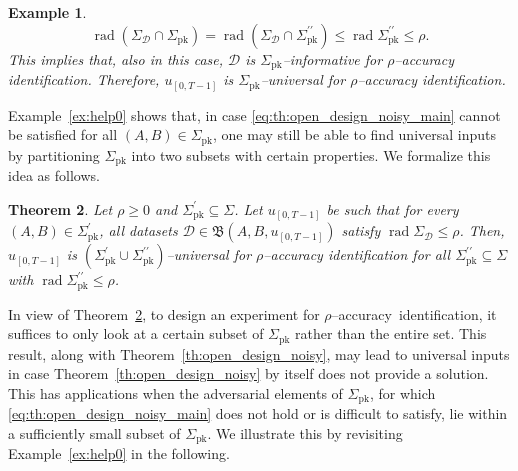 \documentclass[journal,twoside,web]{ieeecolor}
\DeclareMathOperator{\rad}{rad}
\newtheorem{theorem}{Theorem}
\newtheorem{example}[theorem]{Example}
\begin{document}
\begin{example}
\begin{equation}
\rad(\Sigma_\mathcal{D}\cap\Sigma_\text{pk})=\rad(\Sigma_\mathcal{D}\cap\Sigma_\text{pk}^{\prime\prime})\leq\rad\Sigma_\text{pk}^{\prime\prime}\leq \rho.
\end{equation}
This implies that, also in this case, $\mathcal{D}$ is $\Sigma_\text{pk}$--informative for \mbox{$\rho$--accuracy} identification. Therefore, $u_{[0,T-1]}$ is \mbox{$\Sigma_\text{pk}$--universal} for \mbox{$\rho$--accuracy} identification. 
\end{example}

Example~\ref{ex:help0} shows that, in case \eqref{eq:th:open_design_noisy_main} cannot be satisfied for all $(A,B)\in\Sigma_\text{pk}$, one may still be able to find universal inputs by partitioning $\Sigma_\text{pk}$ into two subsets with certain properties. We formalize this idea as follows. 

\begin{theorem}
\label{th:helping_in_exp}
Let $\rho\geq 0$ and $\Sigma_\text{pk}^\prime\subseteq\Sigma$. Let $u_{[0,T-1]}$ be such that for every $(A,B)\in\Sigma_\text{pk}^\prime$, all datasets \mbox{$\mathcal{D}\in\mathfrak{B}(A,B,u_{[0,T-1]})$} satisfy $\rad\Sigma_\mathcal{D}\leq \rho$. Then, $u_{[0,T-1]}$ is \mbox{$(\Sigma_\text{pk}^\prime\cup\Sigma_\text{pk}^{\prime\prime})$--universal} for \mbox{$\rho$--accuracy} identification for all $\Sigma_\text{pk}^{\prime\prime}\subseteq\Sigma$ with $\rad\Sigma_\text{pk}^{\prime\prime}\leq \rho$.
\end{theorem}

In view of Theorem~\ref{th:helping_in_exp}, to design an experiment for \mbox{$\rho$--accuracy identification}, it suffices to only look at a certain subset of $\Sigma_\text{pk}$ rather than the entire set. This result, along with Theorem~\ref{th:open_design_noisy}, may lead to universal inputs in case Theorem~\ref{th:open_design_noisy} by itself does not provide a solution. This has applications when the adversarial elements of $\Sigma_\text{pk}$, for which \eqref{eq:th:open_design_noisy_main} does not hold or is difficult to satisfy, lie within a sufficiently small subset of $\Sigma_\text{pk}$. We illustrate this by revisiting Example~\ref{ex:help0} in the following. 
\end{document}
